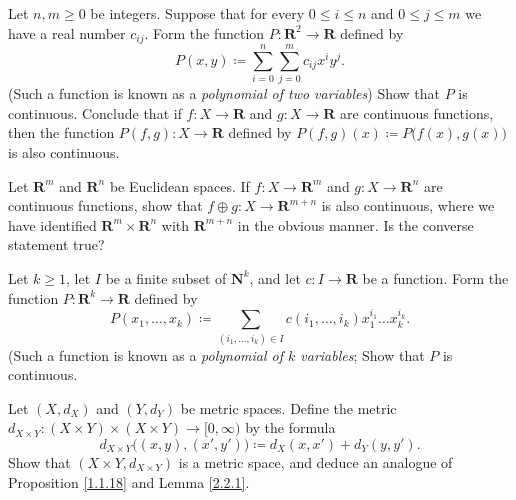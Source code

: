 \begin{exercise}\label{ex 2.2.5}
    Let \(n, m \geq 0\) be integers.
    Suppose that for every \(0 \leq i \leq n\) and \(0 \leq j \leq m\) we have a real number \(c_{ij}\).
    Form the function \(P : \mathbf{R}^2 \to \mathbf{R}\) defined by
    \[
        P(x, y) \coloneqq \sum_{i = 0}^n \sum_{j = 0}^m c_{ij} x^i y^j.
    \]
    (Such a function is known as a \emph{polynomial of two variables})
    Show that \(P\) is continuous.
    Conclude that if \(f : X \to \mathbf{R}\) and \(g : X \to \mathbf{R}\) are continuous functions, then the function \(P(f, g) : X \to \mathbf{R}\) defined by \(P(f, g)(x) \coloneqq P\big(f(x), g(x)\big)\) is also continuous.
\end{exercise}

\begin{exercise}\label{ex 2.2.6}
    Let \(\mathbf{R}^m\) and \(\mathbf{R}^n\) be Euclidean spaces.
    If \(f : X \to \mathbf{R}^m\) and \(g : X \to \mathbf{R}^n\) are continuous functions, show that \(f \oplus g : X \to \mathbf{R}^{m + n}\) is also continuous, where we have identified \(\mathbf{R}^m \times \mathbf{R}^n\) with \(\mathbf{R}^{m + n}\) in the obvious manner.
    Is the converse statement true?
\end{exercise}

\begin{exercise}\label{ex 2.2.7}
    Let \(k \geq 1\), let \(I\) be a finite subset of \(\mathbf{N}^k\), and let \(c : I \to \mathbf{R}\) be a function.
    Form the function \(P : \mathbf{R}^k \to \mathbf{R}\) defined by
    \[
        P(x_1, \dots, x_k) \coloneqq \sum_{(i_1, \dots, i_k) \in I} c(i_1, \dots, i_k) x_1^{i_1} \dots x_k^{i_k}.
    \]
    (Such a function is known as a \emph{polynomial of \(k\) variables};
    Show that \(P\) is continuous.
\end{exercise}

\begin{exercise}\label{ex 2.2.8}
    Let \((X, d_X)\) and \((Y, d_Y)\) be metric spaces.
    Define the metric \(d_{X \times Y} : (X \times Y) \times (X \times Y) \to [0, \infty)\) by the formula
    \[
        d_{X \times Y}\big((x, y), (x', y')\big) \coloneqq d_X(x, x') + d_Y(y, y').
    \]
    Show that \((X \times Y, d_{X \times Y})\) is a metric space, and deduce an analogue of Proposition \ref{1.1.18} and Lemma \ref{2.2.1}.
\end{exercise}

